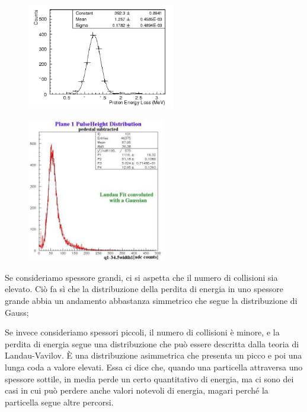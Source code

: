 \begin{minipage}{0.495\textwidth}
    \begin{figure}[H]
        \centering
        \includegraphics[width=6.5cm]{immagini/energy_loss_distribuzione_gauss.png}
    \end{figure}

    \vspace{-0.8cm}

    \begin{figure}[H]
        \centering
        \includegraphics[width=6cm]{immagini/energy_loss_distribuzione_vavilov.png}
    \end{figure}
\end{minipage}
\begin{minipage}{0.5\textwidth}
    \vspace{1cm}Se consideriamo spessore grandi, ci si aspetta che il numero di collisioni sia elevato. Ciò fa sì che la distribuzione della perdita di energia in uno spessore grande abbia un andamento abbastanza simmetrico che segue la distribuzione di Gauss;
    
    \vspace{1.7cm}Se invece consideriamo spessori piccoli, il numero di collisioni è minore, e la perdita di energia segue una distribuzione che può essere descritta dalla teoria di Landau-Vavilov. È una distribuzione asimmetrica che presenta un picco e poi una lunga coda a valore elevati. Essa ci dice che, quando una particella attraversa uno spessore sottile, in media perde un certo quantitativo di energia, ma ci sono dei casi in cui può perdere anche valori notevoli di energia, magari perché la particella segue altre percorsi.
\end{minipage}

